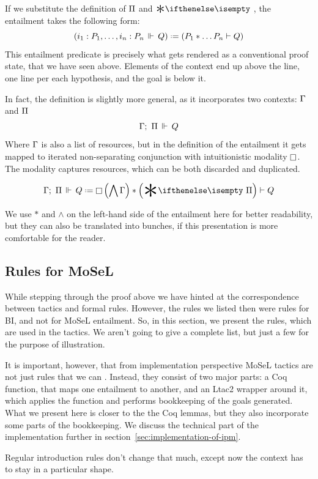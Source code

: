 If we substitute the definition of \(\Pi\) and \(\Sep\), the entailment takes the following form:
\[\left( \entailsOne {i_1 : P_1, \ldots , i_n : P_n} Q \right) \defeq
  \left( P_1 * \ldots P_n \vdash Q \right)\]
This entailment predicate is precisely what gets rendered as a conventional proof state, that we have seen above.
Elements of the context end up above the line, one line per each hypothesis, and the goal is below it.

In fact, the definition is slightly more general, as it incorporates two contexts: \(\Gamma\) and \(\Pi\)
\[\Gamma ;\,\, \Pi \,\Vdash\, Q\]
Where \(\Gamma\) is also a list of resources, but in the definition of the entailment it gets mapped to iterated non-separating conjunction with intuitionistic modality \(\mathop{\Box}\).
The modality captures resources, which can be both discarded and duplicated.

\[\entailsD Q \defeq \intuit \left(\bigwedge \IntuD\right) * \left(\Sep \SpatD\right) \vdash Q\]

We use \(\ast\) and \(\wedge\) on the left-hand side of the entailment here for better readability, but they can also be translated into bunches, if this presentation is more comfortable for the reader.

\subsection{Rules for MoSeL}
\label{sec:rules-regular-ipm}

While stepping through the proof above we have hinted at the correspondence between tactics and formal rules.
However, the rules we listed then were rules for BI, and not for MoSeL entailment.
So, in this section, we present the rules, which are used in the tactics.
We aren't going to give a complete list, but just a few for the purpose of illustration.

It is important, however, that from implementation perspective MoSeL tactics are not just rules that we can .
Instead, they consist of two major parts: a Coq function, that maps one entailment to another, and an Ltac2 wrapper around it, which applies the function and performs bookkeeping of the goals generated.
What we present here is closer to the the Coq lemmas, but they also incorporate some parts of the bookkeeping.
We discuss the technical part of the implementation further in section~\ref{sec:implementation-of-ipm}.

Regular introduction rules don't change that much, except now the context has to stay in a particular shape.


